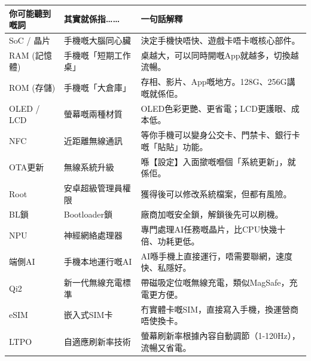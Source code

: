 
\begin{center}
\begin{tabularx}{\linewidth}{|X|X|X|}
\hline
\textbf{你可能聽到嘅詞} & \textbf{其實就係指……} & \textbf{一句話解釋} \tabularnewline
\hline
SoC / 晶片 & 手機嘅大腦同心臟 & 決定手機快唔快、遊戲卡唔卡嘅核心部件。 \tabularnewline
RAM (記憶體) & 手機嘅「短期工作桌」 & 桌越大，可以同時開嘅App就越多，切換越流暢。 \tabularnewline
ROM (存儲) & 手機嘅「大倉庫」 & 存相、影片、App嘅地方。128G、256G講嘅就係佢。 \tabularnewline
OLED / LCD & 螢幕嘅兩種材質 & OLED色彩更艷、更省電；LCD更護眼、成本低。 \tabularnewline
NFC & 近距離無線通訊 & 等你手機可以變身公交卡、門禁卡、銀行卡嘅「貼貼」功能。 \tabularnewline
OTA更新 & 無線系統升級 & 喺【設定】入面撳嘅嗰個「系統更新」，就係佢。 \tabularnewline
Root & 安卓超級管理員權限 & 獲得後可以修改系統檔案，但都有風險。 \tabularnewline
BL鎖 & Bootloader鎖 & 廠商加嘅安全鎖，解鎖後先可以刷機。 \tabularnewline
NPU & 神經網絡處理器 & 專門處理AI任務嘅晶片，比CPU快幾十倍、功耗更低。 \tabularnewline
端側AI & 手機本地運行嘅AI & AI喺手機上直接運行，唔需要聯網，速度快、私隱好。 \tabularnewline
Qi2 & 新一代無線充電標準 & 帶磁吸定位嘅無線充電，類似MagSafe，充電更方便。 \tabularnewline
eSIM & 嵌入式SIM卡 & 冇實體卡嘅SIM，直接寫入手機，換運營商唔使換卡。 \tabularnewline
LTPO & 自適應刷新率技術 & 螢幕刷新率根據內容自動調節（1-120Hz），流暢又省電。 \tabularnewline
\hline
\end{tabularx}
\end{center}
